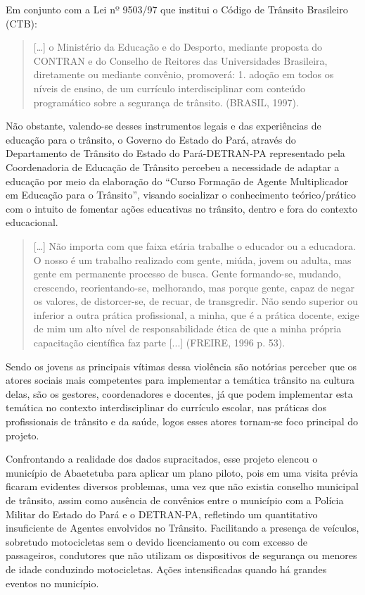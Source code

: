 \documentclass[output=paper,colorlinks,citecolor=brown]{langscibook}
\begin{document}
Em conjunto com a Lei nº 9503/97 que institui o Código de Trânsito Brasileiro (CTB): 

\begin{quote}
    […] o Ministério da Educação e do Desporto, mediante proposta do CONTRAN e do Conselho de Reitores das Universidades Brasileira, diretamente ou mediante convênio, promoverá: 1. adoção em todos os níveis de ensino, de um currículo interdisciplinar com conteúdo programático sobre a segurança de trânsito. (BRASIL, 1997).
\end{quote}


\vskip0.3cm
Não obstante, valendo-se desses instrumentos legais e das experiências de educação para o trânsito, o Governo do Estado do Pará, através do Departamento de Trânsito do Estado do Pará-DETRAN-PA representado pela Coordenadoria de Educação de Trânsito percebeu a necessidade de adaptar a educação por meio da elaboração do “Curso Formação de Agente Multiplicador em Educação para o Trânsito”, visando socializar o conhecimento teórico/prático com o intuito de fomentar ações educativas no trânsito, dentro e fora do contexto educacional.\vskip0.3cm

\begin{quote}
    […] Não importa com que faixa etária trabalhe o educador ou a educadora. O nosso é um trabalho realizado com gente, miúda, jovem ou adulta, mas gente em permanente processo de busca. Gente formando-se, mudando, crescendo, reori\-en\-tan\-do-se, melhorando, mas porque gente, capaz de negar os valores, de dis\-tor\-cer-se, de recuar, de transgredir. Não sendo superior ou inferior a outra prática profissional, a minha, que é a prática docente, exige de mim um alto nível de responsabilidade ética de que a minha própria capacitação científica faz parte [...] (FREIRE, 1996 p. 53).\vskip0.3cm
\end{quote}


Sendo os jovens as principais vítimas dessa violência são notórias perceber que os atores sociais mais competentes para implementar a temática trânsito na cultura delas, são os gestores, coordenadores e docentes, já que podem implementar esta temática no contexto interdisciplinar do currículo escolar, nas práticas dos profissionais de trânsito e da saúde, logos esses atores tornam-se foco principal do projeto.\vskip0.3cm

Confrontando a realidade dos dados supracitados, esse projeto elencou o município de Abaetetuba para aplicar um plano piloto, pois em uma visita prévia ficaram evidentes diversos problemas, uma vez que não existia conselho municipal de trânsito, assim como ausência de convênios entre o município com a Polícia Militar do Estado do Pará e o DETRAN-PA, refletindo um quantitativo insuficiente de Agentes envolvidos no Trânsito. Facilitando a presença de veículos, sobretudo motocicletas sem o devido licenciamento ou com excesso de passageiros, condutores que não utilizam os dispositivos de segurança ou menores de idade conduzindo motocicletas. Ações intensificadas quando há grandes eventos no município.\vskip0.3cm
\end{document}
